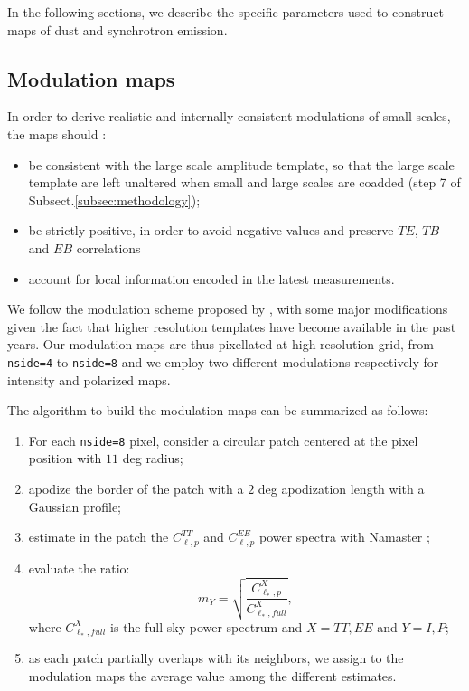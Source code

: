 In the following sections, we describe the specific parameters used to construct maps of dust and synchrotron emission.

\subsection{Modulation maps} \label{subsec:modulation}

In order to derive realistic and internally consistent   modulations of small scales, the maps should  : 

\begin{itemize}
\item  be consistent with the large scale amplitude template, so that the large scale template are left unaltered when small and large scales are coadded (step 7 of Subsect.\ref{subsec:methodology}); 
\item  be strictly positive, in order  to avoid negative values and preserve $TE$, $TB$ and $EB$ correlations
\item   account  for local information encoded in the latest measurements. 
\end{itemize}

We follow the modulation scheme proposed by \citet{Thorne:2017}, with some major  modifications given the fact that  higher resolution templates have become available in the past years. Our  modulation maps are thus  pixellated at high resolution grid, from \texttt{nside=4}  \citep{Thorne:2017} to \texttt{nside=8} and we employ two different modulations respectively for intensity and polarized maps.

The algorithm to build the modulation maps can be summarized as follows: 
\begin{enumerate}
    \item For each \texttt{nside=8} pixel, consider a  circular patch centered at the pixel position with $11$ deg radius; 
    \item apodize the border of the patch with a $2$ deg apodization length with a Gaussian profile; 
    \item estimate  in the patch the $C^{TT}_{\ell, p}$ and $C^{EE}_{\ell,p}$  power spectra with Namaster \citet{Alonso:2019}; 
    \item evaluate the ratio:
    \begin{equation*}
        m_Y= \sqrt{\frac{C^{X}_{\ell_*,p}}{C^{X}_{\ell_*,full}}}, 
    \end{equation*}
    where $C^{X}_{\ell_*,full} $ is the full-sky power spectrum and $X= TT, EE$ and $Y=I, P$;
    \item  as each patch partially overlaps with its neighbors, we assign to the modulation maps the average value among the different estimates. 
\end{enumerate}
 
